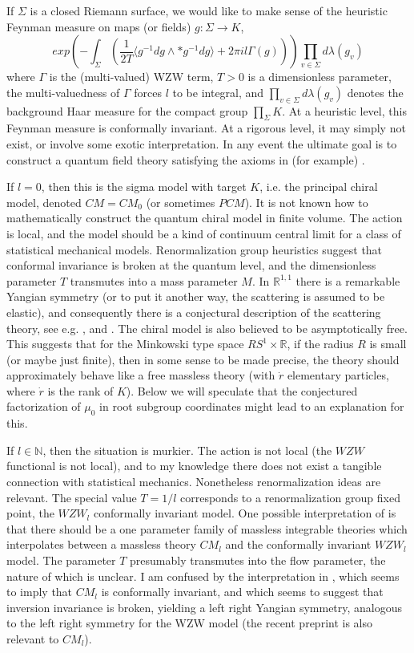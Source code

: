 \documentclass{amsart}
\theoremstyle{conjecture}
\theoremstyle{definition}
\theoremstyle{question}
\theoremstyle{questions}
\theoremstyle{remark}
\theoremstyle{remarks}
\theoremstyle{example}
\numberwithin{equation}{section}
\begin{document}
If $\Sigma$ is a closed Riemann surface, we would like to make sense of the heuristic Feynman measure on maps (or fields)  $g:\Sigma\to K$,
\begin{equation}\label{sigmaaction}exp(-\int_{\Sigma}\left(\frac{ 1}{2T}\langle g^{-1}dg\wedge *g^{-1}dg\rangle+2\pi i l\Gamma(g)\right))\prod_{v\in\Sigma} d\lambda(g_v)\end{equation}
where $\Gamma$ is the (multi-valued) WZW term, $T>0$ is a dimensionless parameter, the multi-valuedness of $\Gamma$ forces $l$ to be integral, and $\prod_{v\in\Sigma} d\lambda(g_v)$
denotes the background Haar measure for the compact group $\prod_{\Sigma}K$. At a heuristic level, this Feynman measure is conformally invariant. At a rigorous level, it may
simply not exist, or involve some exotic interpretation. In any event the ultimate goal is to construct a quantum field theory satisfying the axioms in (for example) \cite{KS}.

If $l=0$, then this is the sigma model with target $K$, i.e. the principal chiral model, denoted $CM=CM_0$ (or sometimes $PCM$). It is not known how to mathematically construct the quantum chiral model in finite volume. The action is local, and the model should be a kind of continuum central limit for a class of statistical mechanical models. Renormalization group heuristics suggest that conformal invariance is broken at the quantum level, and the dimensionless parameter $T$ transmutes into
a mass parameter $M$. In $\mathbb R^{1,1}$ there is a remarkable Yangian symmetry (or to put it another way, the scattering is assumed to be elastic), and consequently there is a conjectural description of the scattering theory, see e.g. \cite{Z1}, \cite{ORW} and \cite{Bernard}. The chiral model is also believed to be asymptotically free. This suggests that
for the Minkowski type space $RS^1\times \mathbb R$, if the radius $R$ is small (or maybe just finite), then in some sense to be made precise, the theory should approximately behave like a free massless theory (with $\dot r$ elementary particles, where $\dot r$ is the rank of $K$). Below we will speculate that the conjectured factorization of $\mu_0$ in root subgroup coordinates might lead to an explanation for this.

If $l\in \mathbb N$, then the situation is murkier. The action is not local (the $WZW$ functional is not local), and to my knowledge there does not exist a tangible connection with statistical mechanics. Nonetheless renormalization ideas are relevant. The special value $T=1/l$ corresponds to a renormalization group fixed point, the $WZW_l$ conformally invariant model. One possible interpretation of \cite{Z2} is that there should be a one parameter family of massless integrable theories which interpolates between a massless theory $CM_l$ and the conformally invariant
$WZW_l$ model. The parameter $T$ presumably transmutes into the flow parameter, the nature of which is unclear. I am confused by the interpretation in \cite{Bernard1}, which seems to imply that $CM_l$ is conformally invariant, and which seems to suggest that inversion invariance is broken, yielding a left right Yangian symmetry, analogous
to the left right symmetry for the WZW model (the recent preprint \cite{PW} is also relevant to $CM_l$).
\end{document}

